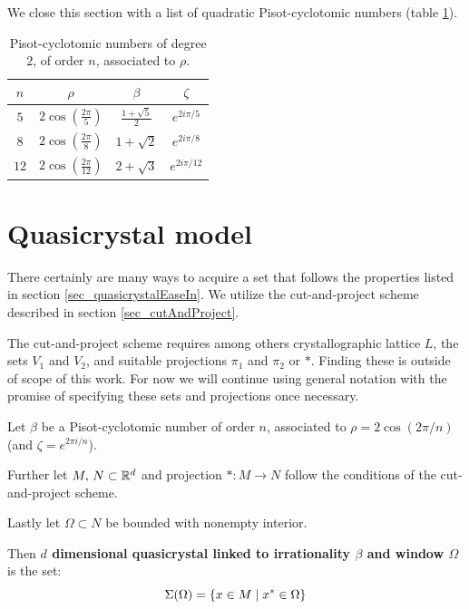 \documentclass[text.tex]{subfiles}
\begin{document}
We close this section with a list of quadratic Pisot-cyclotomic numbers (table \ref{tab_quadraticPisotCyclotomic}). 

\begin{table}[h!]
\centering
\begin{tabular}{cccc}
$n$ & $\rho$ & $\beta$ & $\zeta$ \\
\hline
$5$   & $2 \cos\left(\frac{2\pi}{5}\right)$   & $\frac{1+\sqrt{5}}{2} $   & $e^{2i\pi/5}$ \\
$8$   & $2 \cos\left(\frac{2\pi}{8}\right)$   & $ 1+\sqrt{2} $            & $e^{2i\pi/8}$ \\
$12$  & $2 \cos\left(\frac{2\pi}{12}\right)$  & $ 2+\sqrt{3} $            & $e^{2i\pi/12}$ \\
\end{tabular}
\caption{Pisot-cyclotomic numbers of degree $2$, of order $n$, associated to $\rho$.}
\label{tab_quadraticPisotCyclotomic}
\end{table}

\section{Quasicrystal model}%
There certainly are many ways to acquire a set that follows the properties listed in section \ref{sec_quasicrystalEaseIn}. We utilize the cut-and-project scheme described in section \ref{sec_cutAndProject}. 

The cut-and-project scheme requires among others crystallographic lattice $L$, the sets $V_1$ and $V_2$, and suitable projections $\pi_1$ and $\pi_2$ or $\ast$. Finding these is outside of scope of this work. For now we will continue using general notation with the promise of specifying these sets and projections once necessary. 

\begin{definition}\label{def_quasicrystal}
Let $\beta$ be a Pisot-cyclotomic number of order $n$, associated to $\rho = 2\cos\left(2\pi/n\right)$ (and $\zeta = e^{2\pi i/n}$). 

Further let $M,\, N\subset \mathbb{R}^d$ and projection $\ast:M\rightarrow N$ follow the conditions of the cut-and-project scheme.

Lastly let $\Omega\subset N$ be bounded with nonempty interior. 

Then \textbf{$d$ dimensional quasicrystal linked to irrationality $\beta$ and window $\Omega$} is the set:
$$\Sigma(\Omega) = \{ x \in M\; |\; x^\ast\in \Omega\}$$
\end{definition}
\end{document}

